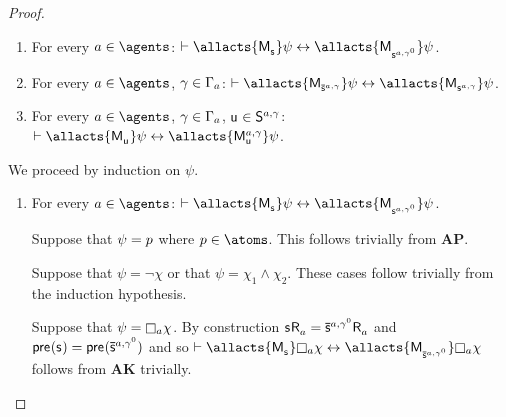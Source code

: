 \begin{proof}
    \begin{enumerate}
        \item For every $\agentA \in \agents$: $\proves \allacts{\aPModel{\aStateS}} \psi \iff \allacts{\aPModel{\aStateS[\agentA,\gamma^0]}} \psi$.
        \item For every $\agentA \in \agents$, $\gamma \in \Gamma_a$: $\proves \allacts{\aPModel{\aPStateS[\agentA,\gamma]}} \psi \iff \allacts{\aPModel{\aStateS[\agentA,\gamma]}} \psi$.
        \item For every $\agentA \in \agents$, $\gamma \in \Gamma_a$, $\aStateU \in \aStates[\agentA,\gamma]$: $\proves \allacts{\aPModel{\aStateU}} \psi \iff \allacts{\aPModel[\agentA,\gamma]{\aStateU}} \psi$.
    \end{enumerate}

    We proceed by induction on $\psi$.

    \begin{enumerate}
        \item For every $\agentA \in \agents$: $\proves \allacts{\aPModel{\aStateS}} \psi \iff \allacts{\aPModel{\aStateS[\agentA,\gamma^0]}} \psi$.

            Suppose that $\psi = p$ where $\atomP \in \atoms$. 
            This follows trivially from {\bf AP}.

            Suppose that $\psi = \neg \chi$ or that $\psi = \chi_1 \land \chi_2$.
            These cases follow trivially from the induction hypothesis.

            Suppose that $\psi = \necessary[\agentA] \chi$.
            By construction $\aStateS \aAccessibility{\agentA} = \aPStateS[\agentA,\gamma^0] \aAccessibility{\agentA}$ and $\aPrecondition(\aStateS) = \aPrecondition(\aPStateS[\agentA,\gamma^0])$ and so $\proves \allacts{\aPModel{\aStateS}} \necessary[\agentA] \chi \iff \allacts{\aPModel{\aPStateS[\agentA,\gamma^0]}} \necessary[\agentA] \chi$ follows from {\bf AK} trivially.


\end{enumerate}
\end{proof}
